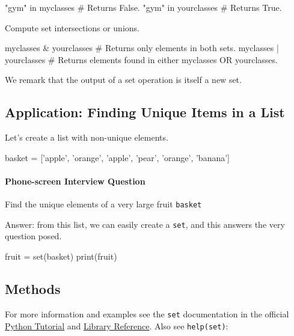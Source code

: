 \documentclass[12pt,letterpaper,twoside]{article}
\begin{document}
\begin{python}
"gym" in myclasses     # Returns False.
"gym" in yourclasses   # Returns True.
\end{python}

Compute set intersections or unions.

\begin{python}
myclasses & yourclasses  # Returns only elements in both sets.
myclasses | yourclasses  # Returns elements found in either myclasses OR yourclasses.
\end{python}

We remark that the output of a set operation is itself a new set.

\subsection{Application: Finding Unique Items in a List}

Let's create a list with non-unique elements.

\begin{python}
basket = ['apple', 'orange', 'apple', 'pear', 'orange', 'banana']
\end{python}

\vspace{-8pt}
\paragraph{Phone-screen Interview Question} Find the unique elements of a very large fruit \texttt{basket}

Answer: from this list, we can easily create a \texttt{set}, and this answers the very question posed.

\begin{python}
fruit = set(basket)
print(fruit)
\end{python}

\subsection{Methods}

For more information and examples see the \texttt{set} documentation in
the official \href{https://docs.python.org/3/tutorial/datastructures.html\#sets}{Python
Tutorial} and
\href{https://docs.python.org/3/library/stdtypes.html\#set-types-set-frozenset}{Library
Reference}.
Also see \texttt{help(set)}:
\end{document}
